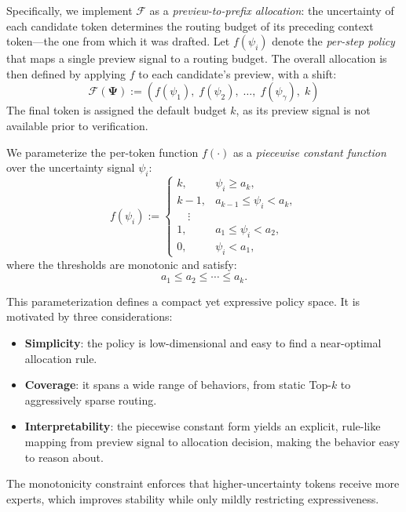 \documentclass[conference]{IEEEtran}
\theoremstyle{definition} %
\begin{document}
Specifically, we implement $\mathcal{F}$ as a \textit{preview-to-prefix allocation}: 
the uncertainty of each candidate token determines the routing budget of its preceding 
context token---the one from which it was drafted.
Let $f(\psi_i)$ denote the \textit{per-step policy} that maps a single preview signal 
to a routing budget. The overall allocation is then defined by applying $f$ 
to each candidate's preview, with a shift:
\begin{equation}
\mathcal{F}(\boldsymbol{\Psi}) := (f(\psi_1),\; f(\psi_2),\; \dots,\; f(\psi_\gamma),\; k)
\end{equation}
The final token is assigned the default budget $k$, as its preview signal is not 
available prior to verification.

We parameterize the per-token function $f(\cdot)$ as a \textit{piecewise constant function} over the uncertainty signal $\psi_i$:
\begin{equation}
f(\psi_i) :=
\begin{cases}
k, & \psi_i \ge a_k, \\
k-1, & a_{k-1} \le \psi_i < a_k, \\
\quad \vdots \\
1, & a_1 \le \psi_i < a_2, \\
0, & \psi_i < a_1,
\end{cases}
\end{equation}
where the thresholds are monotonic and satisfy:
\begin{equation}
a_1 \le a_2 \le \cdots \le a_k.
\label{eq:monotonicity}
\end{equation}

This parameterization defines a compact yet expressive policy space.
It is motivated by three considerations:
\begin{itemize}
    \item \textbf{Simplicity}: the policy is low-dimensional and easy to find a near-optimal allocation rule.
    \item \textbf{Coverage}: it spans a wide range of behaviors, from static Top-$k$ to aggressively sparse routing.
    \item \textbf{Interpretability}: the piecewise constant form yields an explicit, rule-like mapping from preview signal to allocation decision, making the behavior easy to reason about.
\end{itemize}

The monotonicity constraint enforces that higher-uncertainty tokens receive more experts, which improves stability while only mildly restricting expressiveness.
\end{document}
